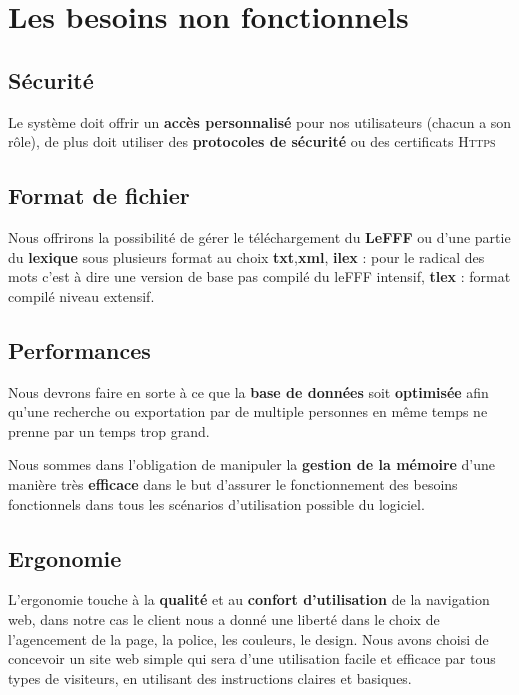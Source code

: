 {\newpage
\section{Les besoins non fonctionnels}

\subsection{Sécurité}
{Le système doit offrir un \textbf{accès personnalisé} pour nos utilisateurs (chacun a son rôle), de plus doit utiliser des \textbf{protocoles de sécurité} ou des certificats \textsc{Https} }

\subsection{Format de fichier}
Nous offrirons la possibilité de gérer le téléchargement du \textbf{LeFFF} ou d'une partie du \textbf{lexique} sous plusieurs format au choix  \textbf{txt},\textbf{xml}, \textbf{ilex} : pour le radical des mots c'est à dire une version de base pas compilé du leFFF intensif, \textbf{tlex} : format compilé niveau extensif.

\subsection{Performances}

{Nous devrons faire en sorte à ce que la \textbf{base de données} soit \textbf{optimisée} afin qu'une recherche ou exportation par de multiple personnes en même temps ne prenne par un temps trop grand.\par}
Nous sommes dans l'obligation de manipuler la \textbf{gestion de la mémoire} d'une manière très \textbf{efficace} dans le but d'assurer le fonctionnement des besoins fonctionnels dans tous les scénarios d'utilisation possible du logiciel. 

\subsection{Ergonomie}
L’ergonomie touche à la \textbf{qualité} et au \textbf{confort d’utilisation} de la navigation web, dans notre cas le client nous a donné une liberté dans le choix de l'agencement de la page, la police, les couleurs, le design. Nous avons choisi de concevoir un site web simple qui sera d'une utilisation facile et efficace par tous types de visiteurs, en utilisant des instructions claires et basiques.

}
